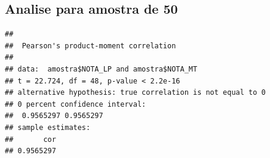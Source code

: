 \documentclass[
]{article}
\newenvironment{Shaded}{\begin{snugshade}}{\end{snugshade}}
\newcommand{\AttributeTok}[1]{\textcolor[rgb]{0.13,0.29,0.53}{#1}}
\newcommand{\DecValTok}[1]{\textcolor[rgb]{0.00,0.00,0.81}{#1}}
\newcommand{\FunctionTok}[1]{\textcolor[rgb]{0.13,0.29,0.53}{\textbf{#1}}}
\newcommand{\NormalTok}[1]{#1}
\newcommand{\SpecialCharTok}[1]{\textcolor[rgb]{0.81,0.36,0.00}{\textbf{#1}}}
\newcommand{\StringTok}[1]{\textcolor[rgb]{0.31,0.60,0.02}{#1}}
\begin{document}
{\subsection{Analise para amostra de
50}\label{analise-para-amostra-de-50-4}

\begin{Shaded}
\end{Shaded}

\begin{verbatim}
## 
##  Pearson's product-moment correlation
## 
## data:  amostra$NOTA_LP and amostra$NOTA_MT
## t = 22.724, df = 48, p-value < 2.2e-16
## alternative hypothesis: true correlation is not equal to 0
## 0 percent confidence interval:
##  0.9565297 0.9565297
## sample estimates:
##       cor 
## 0.9565297
\end{verbatim}
\end{document}
